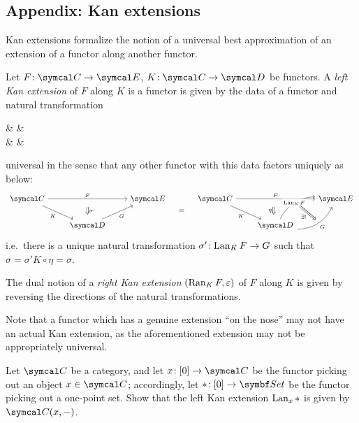\subsection{Appendix: Kan extensions}
Kan extensions formalize the notion of a universal best approximation of an extension of a functor along another functor.
\begin{definition}
	Let \(F\!:\calC\to\calE\), \(K\!:\calC\to\calD\) be functors. A \emph{left Kan extension} of \(F\) along \(K\) is a functor is given by the data of a functor and natural transformation
	\begin{diagram*}[cramped]
		\calC\ar[rr,"F",""{below,name=A}]\ar[dr,"K"'] & & \calE \\
		& \calD\ar[ur,"\Lan_K{F}"'] & \ar[from=A,to=l,Rightarrow,"\eta",shorten=2mm]
	\end{diagram*}
	universal in the sense that any other functor with this data factors uniquely as below:
	\[
	\begin{tikzcd}
		\calC\ar[rr,"F",""{below,name=A}]\ar[dr,"K"'] & & \calE \\
		& \calD\ar[ur,"G"'] & \ar[from=A,to=l,Rightarrow,"\sigma",shorten=2mm]
	\end{tikzcd}\quad=\quad
	\begin{tikzcd}
		\calC\ar[rr,"F",""{below,name=A}]\ar[dr,"K"'] & & \calE \\
		& \calD\ar[ur,bend left,"\Lan_K{F}" description,""{right,name=B}]\ar[ur,shift right,bend right,"G"',""{right,name=C}] & \ar[from=A,to=l,Rightarrow,shift right,"\eta"',shorten=2mm]\ar[from=B,to=C,shorten=1.2mm,Rightarrow,"\exists!"']
	\end{tikzcd}
	\]
	i.e.\ there is a unique natural transformation \(\sigma'\!:\operatorname{Lan}_K{F}\to G\) such that \(\sigma = \sigma'K\circ\eta=\sigma\).

	The dual notion of a \emph{right Kan extension} \((\operatorname{Ran}_K{F},\varepsilon)\) of \(F\) along \(K\) is given by reversing the directions of the natural transformations.
\end{definition}

Note that a functor which has a genuine extension ``on the nose'' may not have an actual Kan extension, as the aforementioned extension may not be appropriately universal.

\begin{exercise*}
	Let \(\calC\) be a category, and let \(x\!:[0]\to\calC\) be the functor picking out an object \(x\in\calC\); accordingly, let \(*\!:[0]\to\Set\) be the functor picking out a one-point set.
	Show that the left Kan extension \(\operatorname{Lan}_x{*}\) is given by \(\calC(x,-)\).
\end{exercise*}

